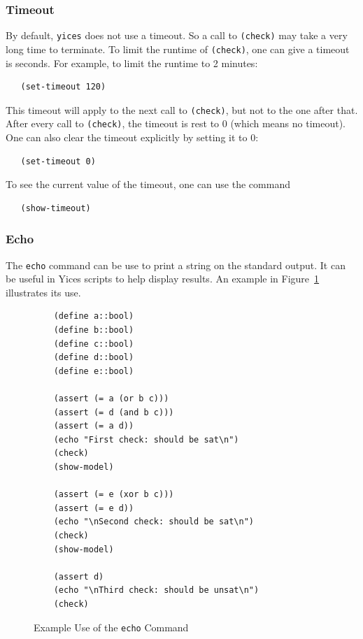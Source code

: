 \documentclass[11pt,twoside,fleqn,openright,titlepage]{cslreport}
\begin{document}
\subsubsection*{Timeout}

By default, \texttt{yices} does not use a timeout. So a call to
\texttt{(check)} may take a very long time to terminate. To limit the
runtime of \texttt{(check)}, one can give a timeout is seconds. For
example, to limit the runtime to 2 minutes:
\begin{small}
\begin{verbatim}
   (set-timeout 120)
\end{verbatim}
\end{small}
This timeout will apply to the next call to \texttt{(check)}, but not
to the one after that. After every call to \texttt{(check)}, the
timeout is rest to 0 (which means no timeout). One can also clear the
timeout explicitly by setting it to 0:
\begin{small}
\begin{verbatim}
   (set-timeout 0)
\end{verbatim}
\end{small}
To see the current value of the timeout, one can use the command
\begin{small}
\begin{verbatim}
   (show-timeout)
\end{verbatim}
\end{small}

\subsubsection*{Echo}

The \texttt{echo} command can be use to print a string on the standard
output. It can be useful in Yices scripts to help display
results. An example in Figure~\ref{example-echo} illustrates its use.

\begin{figure}
\begin{center}
\begin{footnotesize}
\begin{verbatim}
    (define a::bool)
    (define b::bool)
    (define c::bool)
    (define d::bool)
    (define e::bool)

    (assert (= a (or b c)))
    (assert (= d (and b c)))
    (assert (= a d))
    (echo "First check: should be sat\n")
    (check)
    (show-model)

    (assert (= e (xor b c)))
    (assert (= e d))
    (echo "\nSecond check: should be sat\n")
    (check)
    (show-model)

    (assert d)
    (echo "\nThird check: should be unsat\n")
    (check)
\end{verbatim}
\end{footnotesize}
\end{center}
\caption{Example Use of the \texttt{echo} Command}
\label{example-echo}
\end{figure}
\end{document}
